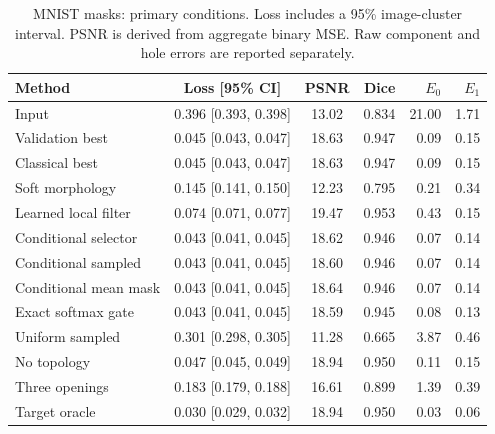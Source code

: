 \begin{table}[htbp]

\centering\small

\caption{MNIST masks: primary conditions. Loss includes a 95\% image-cluster interval. PSNR is derived from aggregate binary MSE. Raw component and hole errors are reported separately.}

\begin{tabular}{lccrrr}

\toprule Method & Loss [95\% CI] & PSNR & Dice & $E_0$ & $E_1$\\\midrule

Input & 0.396 [0.393, 0.398] & 13.02 & 0.834 & 21.00 & 1.71\\

Validation best & 0.045 [0.043, 0.047] & 18.63 & 0.947 & 0.09 & 0.15\\

Classical best & 0.045 [0.043, 0.047] & 18.63 & 0.947 & 0.09 & 0.15\\

Soft morphology & 0.145 [0.141, 0.150] & 12.23 & 0.795 & 0.21 & 0.34\\

Learned local filter & 0.074 [0.071, 0.077] & 19.47 & 0.953 & 0.43 & 0.15\\

Conditional selector & 0.043 [0.041, 0.045] & 18.62 & 0.946 & 0.07 & 0.14\\

Conditional sampled & 0.043 [0.041, 0.045] & 18.60 & 0.946 & 0.07 & 0.14\\

Conditional mean mask & 0.043 [0.041, 0.045] & 18.64 & 0.946 & 0.07 & 0.14\\

Exact softmax gate & 0.043 [0.041, 0.045] & 18.59 & 0.945 & 0.08 & 0.13\\

Uniform sampled & 0.301 [0.298, 0.305] & 11.28 & 0.665 & 3.87 & 0.46\\

No topology & 0.047 [0.045, 0.049] & 18.94 & 0.950 & 0.11 & 0.15\\

Three openings & 0.183 [0.179, 0.188] & 16.61 & 0.899 & 1.39 & 0.39\\

Target oracle & 0.030 [0.029, 0.032] & 18.94 & 0.950 & 0.03 & 0.06\\

\bottomrule\end{tabular}

\end{table}

